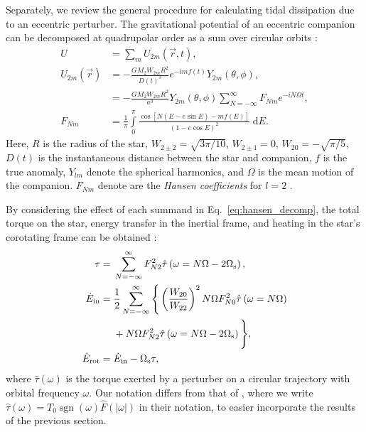 \documentclass[
        fleqn,
        usenatbib,
    ]{mnras}
\newcommand*{\abs}[1]{\left|#1\right|}
\newcommand*{\p}[1]{\left(#1\right)}
\newcommand*{\s}[1]{\left[#1\right]}
\DeclareMathOperator*{\sgn}{sgn}
\begin{document}
Separately, we review the general procedure for calculating tidal dissipation
due to an eccentric perturber. The gravitational potential of an eccentric
companion can be decomposed at quadrupolar order as a sum over circular orbits
\citep{sl,vlf}:
\begin{align}
    U &= \sum\limits_m U_{2m} \p{\vec{r}, t},\label{eq:u_ecc}\\
    U_{2m}\p{\vec{r}} &= -\frac{GM_2 W_{2m} R^2}{D(t)^3}
            e^{-imf(t)} Y_{2m}(\theta, \phi),\nonumber\\
        &= -\frac{GM_2W_{2m}R^2}{a^3}Y_{2m}\p{\theta, \phi}
            \sum\limits_{N = -\infty}^\infty F_{Nm}e^{-iN\Omega t},
            \label{eq:hansen_decomp}\\
    F_{Nm} &= \frac{1}{\pi}\int\limits_{0}^{\pi}
        \frac{\cos\s{N\p{E - e\sin E} - mf(E)}}
            {\p{1 - e\cos E}^2}\;\mathrm{d}E.
\end{align}
Here, $R$ is the radius of the star, $W_{2 \pm 2} = \sqrt{3\pi/10}$, $W_{2 \pm
1} = 0$, $W_{20} = -\sqrt{\pi / 5}$, $D(t)$ is the instantaneous distance
between the star and companion, $f$ is the true anomaly, $Y_{lm}$ denote the
spherical harmonics, and $\Omega$ is the mean motion of the companion. $F_{Nm}$
denote are the \emph{Hansen coefficients} for $l = 2$ \citep[also denoted
$X^n_{2m}$ in][]{murray1999solar}.

By considering the effect of each summand in Eq.~\eqref{eq:hansen_decomp}, the
total torque on the star, energy transfer in the inertial frame, and heating in
the star's corotating frame can be obtained \citep{sl, vlf}:
\begin{align}
    \tau ={}& \sum\limits_{N = -\infty}^\infty F_{N2}^2
        \hat{\tau}\p{\omega =
        N\Omega - 2\Omega_{\rm s}},\label{eq:tau_sum}
        \\
    \dot{E}_{\rm in} ={}&
        \frac{1}{2}\sum\limits_{N = -\infty}^\infty\Bigg\{
            \p{\frac{W_{20}}{W_{22}}}^2 N\Omega F_{N0}^2
            \hat{\tau}\p{\omega = N\Omega}\nonumber\\
            &+ N\Omega F_{N2}^2 \hat{\tau}\p{\omega =
            N\Omega - 2\Omega_{\rm s}}\Bigg\},\label{eq:edot_in}\\
    \dot{E}_{\rm rot} ={}& \dot{E}_{\rm in} - \Omega_{\rm s} \tau \label{eq:edot_rot},
\end{align}
where $\hat{\tau}(\omega)$ is the torque exerted by a perturber on a circular
trajectory with orbital frequency $\omega$. Our notation differs from that of
\citet{vlf}, where we write $\hat{\tau}(\omega) = T_0 \sgn(\omega)
\hat{F}(\abs{\omega})$ in their notation, to easier incorporate the results of
the previous section.
\end{document}
